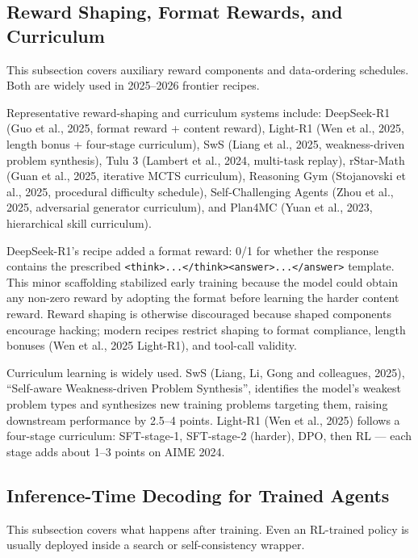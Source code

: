 \subsection{Reward Shaping, Format Rewards, and Curriculum}\label{reward-shaping-format-rewards-and-curriculum}

This subsection covers auxiliary reward components and data-ordering schedules. Both are widely used in 2025--2026 frontier recipes.

Representative reward-shaping and curriculum systems include: DeepSeek-R1 (Guo et al., 2025, format reward + content reward), Light-R1 (Wen et al., 2025, length bonus + four-stage curriculum), SwS (Liang et al., 2025, weakness-driven problem synthesis), Tulu 3 (Lambert et al., 2024, multi-task replay), rStar-Math (Guan et al., 2025, iterative MCTS curriculum), Reasoning Gym (Stojanovski et al., 2025, procedural difficulty schedule), Self-Challenging Agents (Zhou et al., 2025, adversarial generator curriculum), and Plan4MC (Yuan et al., 2023, hierarchical skill curriculum).

DeepSeek-R1's recipe added a format reward: 0/1 for whether the response contains the prescribed \texttt{\textless{}think\textgreater{}...\textless{}/think\textgreater{}\textless{}answer\textgreater{}...\textless{}/answer\textgreater{}} template. This minor scaffolding stabilized early training because the model could obtain any non-zero reward by adopting the format before learning the harder content reward. Reward shaping is otherwise discouraged because shaped components encourage hacking; modern recipes restrict shaping to format compliance, length bonuses (Wen et al., 2025 Light-R1), and tool-call validity.

Curriculum learning is widely used. SwS (Liang, Li, Gong and colleagues, 2025), ``Self-aware Weakness-driven Problem Synthesis'', identifies the model's weakest problem types and synthesizes new training problems targeting them, raising downstream performance by 2.5--4 points. Light-R1 (Wen et al., 2025) follows a four-stage curriculum: SFT-stage-1, SFT-stage-2 (harder), DPO, then RL --- each stage adds about 1--3 points on AIME 2024.

\subsection{Inference-Time Decoding for Trained Agents}\label{inference-time-decoding-for-trained-agents}

This subsection covers what happens after training. Even an RL-trained policy is usually deployed inside a search or self-consistency wrapper.

